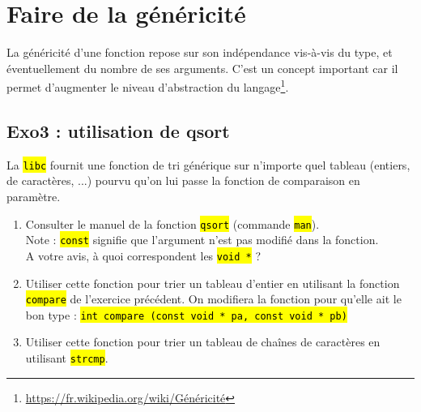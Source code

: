 \documentclass[final, a4paper, openbib, ]{article} %
\let\OldTexttt\texttt
\renewcommand{\texttt}[1]{\OldTexttt{\hl{#1}}}
\begin{document}
\section{Faire de la généricité}

La généricité d'une fonction repose sur son indépendance vis-à-vis du type, et éventuellement du nombre de ses arguments.
C'est un concept important car il permet d'augmenter le niveau d'abstraction du langage\footnote{\url{https://fr.wikipedia.org/wiki/Généricité}}.

\subsection{Exo3 : utilisation de qsort}

La \texttt{libc} fournit une fonction de tri générique sur n'importe quel tableau (entiers, de caractères, ...) pourvu qu'on lui passe la fonction de comparaison en paramètre.

\begin{enumerate}
	\item Consulter le manuel de la fonction \texttt{qsort} (commande \texttt{man}).\\
	Note : \texttt{const} signifie que l'argument n'est pas modifié dans la fonction.\\
	A votre avis, à quoi correspondent les \texttt{void *} ?
	\item Utiliser cette fonction pour trier un tableau d'entier en utilisant la fonction \texttt{compare} de l'exercice précédent.
	On modifiera la fonction pour qu'elle ait le bon type :
	\texttt{int compare (const void * pa, const void * pb)}
	\item Utiliser cette fonction pour trier un tableau de chaînes de caractères en utilisant \texttt{strcmp}.
\end{enumerate}
\end{document}
